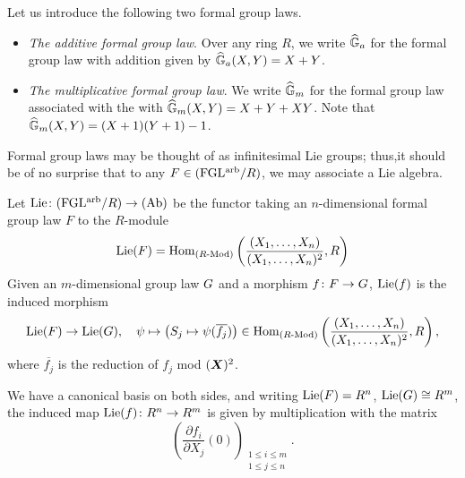 \documentclass[../main.tex]{subfiles}
\begin{document}
\begin{xpl} Let us introduce the following two formal group laws.
  \begin{itemize}
    \item \textit{The additive formal group law}. Over any ring $R$, we write $\widehat{\mathbb{G}}_a$ for the formal group law with addition given by 
      $\widehat{\mathbb{G}}_a(X,Y) = X + Y$. 
    \item \textit{The multiplicative formal group law}. We write $\widehat{\mathbb{G}}_m$ for
      the formal group law associated with the with $\widehat{\mathbb{G}}_m(X,Y) = X + Y +
      XY$. Note that $\widehat{\mathbb{G}}_m(X,Y) = (X+1)(Y+1) - 1$. 
  \end{itemize}
\end{xpl}

Formal group laws may be thought of as infinitesimal Lie groups; thus,it should be of no surprise that to
any $F \in {(\mathrm{FGL^{arb}}/{R})}$, we may associate a Lie algebra. 

\begin{defi}
Let $\operatorname{Lie}\colon {(\mathrm{FGL^{arb}}/{R})} \to {(\mathrm{Ab})}$ be the functor taking an $n$-dimensional 
formal group law $F$ to the $R$-module
\begin{equation*}
  \operatorname{Lie}({F}) = \operatorname{Hom}_{{({R}\textnormal-\allowbreak\mathrm{Mod})}} \left( \frac{(X_1, \dots, X_n)}{(X_1, \dots,
  X_n)^2}, R \right) 
\end{equation*}
Given an $m$-dimensional group law ${G}$ and a morphism ${f}\colon {F} \to
{G}$, $\operatorname{Lie}({f})$ is the induced morphism
\begin{equation*}
  \operatorname{Lie}({F}) \to \operatorname{Lie}({G}), \quad \psi \mapsto \left( S_j \mapsto \psi
  (\overline{f_j})\right) \in 
  \operatorname{Hom}_{({R}\textnormal-\allowbreak\mathrm{Mod})}\left(\frac{(X_1, \dots, X_n)}{(X_1, \dots, X_n)^2}, R \right),
\end{equation*}
where $\overline{ f_j}$ is the reduction of $f_j$ mod $(\boldsymbol{X})^2$. 
\end{defi}
We have a canonical basis on both sides, and writing $\operatorname{Lie}({F}) = R^n$, 
$\operatorname{Lie}({G}) \cong R^m$, the induced map $\operatorname{Lie}({f}) \colon R^n \to R^m$ is
given by multiplication with the matrix 
\begin{equation*}
  \left( \frac {\partial f_i}{\partial X_j} (0) \right)_{\substack{1 \leq i \leq m \\ 1 \leq j \leq n}}.
\end{equation*}
\end{document}
